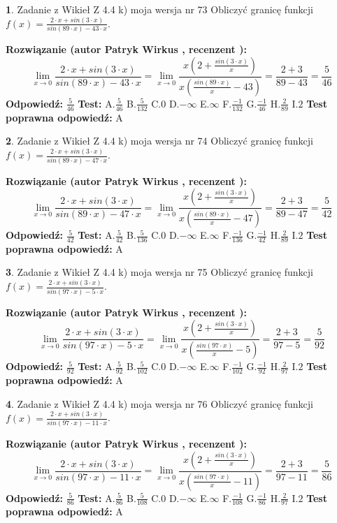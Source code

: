 \documentclass[12pt, a4paper]{article}
\theoremstyle{definition} %
\newtheorem{zad}{}
\newcommand{\zadStart}[1]{\begin{zad}#1\newline}
\newcommand{\zadStop}{\end{zad}}
\newcommand{\rozwStart}[2]{\noindent \textbf{Rozwiązanie (autor #1 , recenzent #2): }\newline}
\newcommand{\rozwStop}{\newline}
\newcommand{\odpStart}{\noindent \textbf{Odpowiedź:}\newline}
\newcommand{\odpStop}{\newline}
\newcommand{\testStart}{\noindent \textbf{Test:}\newline}
\newcommand{\testStop}{\newline}
\newcommand{\kluczStart}{\noindent \textbf{Test poprawna odpowiedź:}\newline}
\newcommand{\kluczStop}{\newline}
\begin{document}
\zadStart{Zadanie z Wikieł Z 4.4 k) moja wersja nr 73}
Obliczyć granicę funkcji $f(x)=\frac{2\cdot x +sin(3\cdot x)}{sin(89\cdot x) -43\cdot x}$.
\zadStop
\rozwStart{Patryk Wirkus}{}
$$\lim\limits_{x\to 0}\frac{2\cdot x +sin(3\cdot x)}{sin(89\cdot x) -43\cdot x}
=\lim\limits_{x\to 0}\frac{x(2+\frac{sin(3\cdot x)}{x})}{x(\frac{sin(89\cdot x)}{x}-43)}
=\frac{2+3}{89-43} = \frac{5}{46}$$
\rozwStop
\odpStart
$\frac{5}{46}$
\odpStop
\testStart
A.$\frac{5}{46}$
B.$\frac{5}{132}$
C.$0$
D.$-\infty$
E.$\infty$
F.$\frac{-1}{132}$
G.$\frac{-1}{46}$
H.$\frac{2}{89}$
I.$2$
\testStop
\kluczStart
A
\kluczStop



\zadStart{Zadanie z Wikieł Z 4.4 k) moja wersja nr 74}
Obliczyć granicę funkcji $f(x)=\frac{2\cdot x +sin(3\cdot x)}{sin(89\cdot x) -47\cdot x}$.
\zadStop
\rozwStart{Patryk Wirkus}{}
$$\lim\limits_{x\to 0}\frac{2\cdot x +sin(3\cdot x)}{sin(89\cdot x) -47\cdot x}
=\lim\limits_{x\to 0}\frac{x(2+\frac{sin(3\cdot x)}{x})}{x(\frac{sin(89\cdot x)}{x}-47)}
=\frac{2+3}{89-47} = \frac{5}{42}$$
\rozwStop
\odpStart
$\frac{5}{42}$
\odpStop
\testStart
A.$\frac{5}{42}$
B.$\frac{5}{136}$
C.$0$
D.$-\infty$
E.$\infty$
F.$\frac{-1}{136}$
G.$\frac{-1}{42}$
H.$\frac{2}{89}$
I.$2$
\testStop
\kluczStart
A
\kluczStop



\zadStart{Zadanie z Wikieł Z 4.4 k) moja wersja nr 75}
Obliczyć granicę funkcji $f(x)=\frac{2\cdot x +sin(3\cdot x)}{sin(97\cdot x) -5\cdot x}$.
\zadStop
\rozwStart{Patryk Wirkus}{}
$$\lim\limits_{x\to 0}\frac{2\cdot x +sin(3\cdot x)}{sin(97\cdot x) -5\cdot x}
=\lim\limits_{x\to 0}\frac{x(2+\frac{sin(3\cdot x)}{x})}{x(\frac{sin(97\cdot x)}{x}-5)}
=\frac{2+3}{97-5} = \frac{5}{92}$$
\rozwStop
\odpStart
$\frac{5}{92}$
\odpStop
\testStart
A.$\frac{5}{92}$
B.$\frac{5}{102}$
C.$0$
D.$-\infty$
E.$\infty$
F.$\frac{-1}{102}$
G.$\frac{-1}{92}$
H.$\frac{2}{97}$
I.$2$
\testStop
\kluczStart
A
\kluczStop



\zadStart{Zadanie z Wikieł Z 4.4 k) moja wersja nr 76}
Obliczyć granicę funkcji $f(x)=\frac{2\cdot x +sin(3\cdot x)}{sin(97\cdot x) -11\cdot x}$.
\zadStop
\rozwStart{Patryk Wirkus}{}
$$\lim\limits_{x\to 0}\frac{2\cdot x +sin(3\cdot x)}{sin(97\cdot x) -11\cdot x}
=\lim\limits_{x\to 0}\frac{x(2+\frac{sin(3\cdot x)}{x})}{x(\frac{sin(97\cdot x)}{x}-11)}
=\frac{2+3}{97-11} = \frac{5}{86}$$
\rozwStop
\odpStart
$\frac{5}{86}$
\odpStop
\testStart
A.$\frac{5}{86}$
B.$\frac{5}{108}$
C.$0$
D.$-\infty$
E.$\infty$
F.$\frac{-1}{108}$
G.$\frac{-1}{86}$
H.$\frac{2}{97}$
I.$2$
\testStop
\kluczStart
A
\kluczStop
\end{document}
